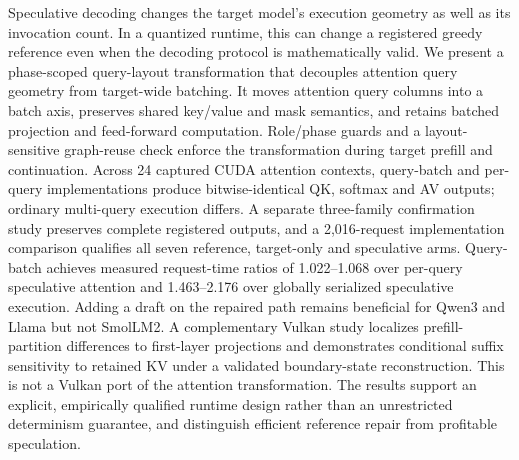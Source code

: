 Speculative decoding changes the target model's execution geometry as well as its invocation count. In a quantized runtime, this can change a registered greedy reference even when the decoding protocol is mathematically valid. We present a phase-scoped query-layout transformation that decouples attention query geometry from target-wide batching. It moves attention query columns into a batch axis, preserves shared key/value and mask semantics, and retains batched projection and feed-forward computation. Role/phase guards and a layout-sensitive graph-reuse check enforce the transformation during target prefill and continuation. Across 24 captured CUDA attention contexts, query-batch and per-query implementations produce bitwise-identical QK, softmax and AV outputs; ordinary multi-query execution differs. A separate three-family confirmation study preserves complete registered outputs, and a 2,016-request implementation comparison qualifies all seven reference, target-only and speculative arms. Query-batch achieves measured request-time ratios of 1.022--1.068 over per-query speculative attention and 1.463--2.176 over globally serialized speculative execution. Adding a draft on the repaired path remains beneficial for Qwen3 and Llama but not SmolLM2. A complementary Vulkan study localizes prefill-partition differences to first-layer projections and demonstrates conditional suffix sensitivity to retained KV under a validated boundary-state reconstruction. This is not a Vulkan port of the attention transformation. The results support an explicit, empirically qualified runtime design rather than an unrestricted determinism guarantee, and distinguish efficient reference repair from profitable speculation.

